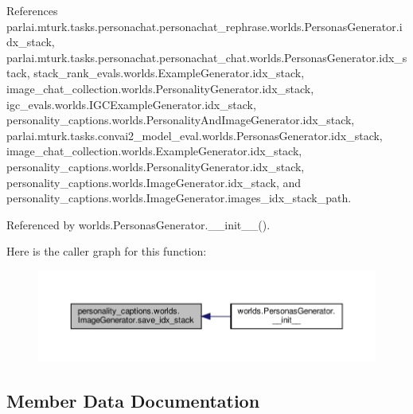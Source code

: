 References parlai.\+mturk.\+tasks.\+personachat.\+personachat\+\_\+rephrase.\+worlds.\+Personas\+Generator.\+idx\+\_\+stack, parlai.\+mturk.\+tasks.\+personachat.\+personachat\+\_\+chat.\+worlds.\+Personas\+Generator.\+idx\+\_\+stack, stack\+\_\+rank\+\_\+evals.\+worlds.\+Example\+Generator.\+idx\+\_\+stack, image\+\_\+chat\+\_\+collection.\+worlds.\+Personality\+Generator.\+idx\+\_\+stack, igc\+\_\+evals.\+worlds.\+I\+G\+C\+Example\+Generator.\+idx\+\_\+stack, personality\+\_\+captions.\+worlds.\+Personality\+And\+Image\+Generator.\+idx\+\_\+stack, parlai.\+mturk.\+tasks.\+convai2\+\_\+model\+\_\+eval.\+worlds.\+Personas\+Generator.\+idx\+\_\+stack, image\+\_\+chat\+\_\+collection.\+worlds.\+Example\+Generator.\+idx\+\_\+stack, personality\+\_\+captions.\+worlds.\+Personality\+Generator.\+idx\+\_\+stack, personality\+\_\+captions.\+worlds.\+Image\+Generator.\+idx\+\_\+stack, and personality\+\_\+captions.\+worlds.\+Image\+Generator.\+images\+\_\+idx\+\_\+stack\+\_\+path.



Referenced by worlds.\+Personas\+Generator.\+\_\+\+\_\+init\+\_\+\+\_\+().

Here is the caller graph for this function\+:
\nopagebreak
\begin{figure}[H]
\begin{center}
\leavevmode
\includegraphics[width=350pt]{classpersonality__captions_1_1worlds_1_1ImageGenerator_a1a62516fa0aad79a400d8824f7353d42_icgraph}
\end{center}
\end{figure}


\subsection{Member Data Documentation}
\mbox{\label{classpersonality__captions_1_1worlds_1_1ImageGenerator_a4a79f6542b070b63fb41d09306a95ef9}} 
